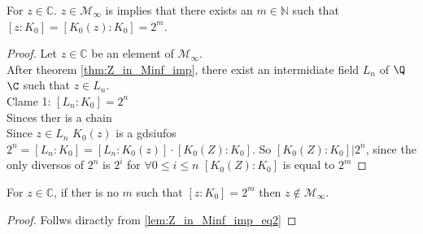 \begin{lemma} 
    \label{lem:Z_in_Minf_imp_eq2}
    For $z \in \mathbb{C}$. $z \in \mathcal{M}_{\infty}$ is implies that there exists an $m \in \mathbb{N}$ such that $[z:K_0] = [K_0(z):K_0]= 2^m$.
\end{lemma}

\begin{proof}  %
    Let $z \in \mathbb{C}$ be an element of  $\mathcal{M}_{\infty}$.\\
    After theorem \ref{thm:Z_in_Minf_imp}, there exist an intermidiate field $L_n$ of $\Q$ $\C$ such that $z\in L_n$.\\
    Clame 1: $[L_n:K_0]= 2^n$\\

    Sinces ther is a chain \\
    Since $z\in L_n$ $K_0(z)$ is a gdsiufos $2^n=[L_n : K_0] = [L_n : K_0(z)] \cdot [K_0(Z):K_0]$.
    So $[K_0(Z):K_0] | 2^n$, since the only diversos of $2^n$ is $2^i$ for $\forall 0\le i \le n$ $[K_0(Z):K_0]$ is equal to $2^m$
\end{proof}

\begin{corollary}
    \label{cor:not_in_M_inf}
    For $z \in \mathbb{C}$, if ther is no $m$ such that $[z:K_0]=2^m$ then $z\notin \mathcal{M}_{\infty}$.
\end{corollary}

\begin{proof}
    Follws diractly from \ref{lem:Z_in_Minf_imp_eq2}
\end{proof}

